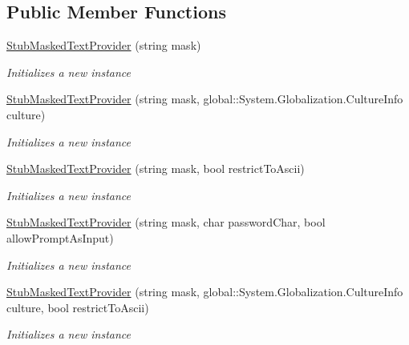 \subsection*{Public Member Functions}
\begin{DoxyCompactItemize}
\item 
\hyperlink{class_system_1_1_component_model_1_1_fakes_1_1_stub_masked_text_provider_ac08af6f8ec2cd3b38d41a39f5b61f6ff}{Stub\-Masked\-Text\-Provider} (string mask)
\begin{DoxyCompactList}\small\item\em Initializes a new instance\end{DoxyCompactList}\item 
\hyperlink{class_system_1_1_component_model_1_1_fakes_1_1_stub_masked_text_provider_a980693ea3b284a5a8403fabc23d381d9}{Stub\-Masked\-Text\-Provider} (string mask, global\-::\-System.\-Globalization.\-Culture\-Info culture)
\begin{DoxyCompactList}\small\item\em Initializes a new instance\end{DoxyCompactList}\item 
\hyperlink{class_system_1_1_component_model_1_1_fakes_1_1_stub_masked_text_provider_a5e17f915c76bb11c21bb2ddc0a8edbc1}{Stub\-Masked\-Text\-Provider} (string mask, bool restrict\-To\-Ascii)
\begin{DoxyCompactList}\small\item\em Initializes a new instance\end{DoxyCompactList}\item 
\hyperlink{class_system_1_1_component_model_1_1_fakes_1_1_stub_masked_text_provider_ac62b44ebf7cdcf7f7d76b24cf2de62bb}{Stub\-Masked\-Text\-Provider} (string mask, char password\-Char, bool allow\-Prompt\-As\-Input)
\begin{DoxyCompactList}\small\item\em Initializes a new instance\end{DoxyCompactList}\item 
\hyperlink{class_system_1_1_component_model_1_1_fakes_1_1_stub_masked_text_provider_a71136a23e673423029f14b5dd483c98b}{Stub\-Masked\-Text\-Provider} (string mask, global\-::\-System.\-Globalization.\-Culture\-Info culture, bool restrict\-To\-Ascii)
\begin{DoxyCompactList}\small\item\em Initializes a new instance\end{DoxyCompactList}\item 

\end{DoxyCompactItemize}
